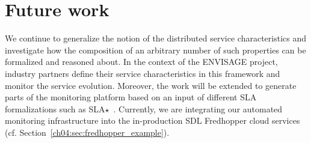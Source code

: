 
\section{Future work}
\label{ch04:sec:conclusion}




We continue to generalize the notion of the distributed service characteristics and investigate how the composition of an arbitrary number of such properties can be formalized and reasoned about.
In the context of the ENVISAGE project, industry partners define their service characteristics in this framework and monitor the service evolution.
Moreover, the work will be extended to generate parts of the monitoring platform based on an input of different SLA formalizations such as SLA$\star$~\cite{kearney2010sla}.
Currently, we are integrating our automated monitoring infrastructure
into the in-production SDL Fredhopper cloud services (cf. Section~\ref{ch04:sec:fredhopper_example}).
